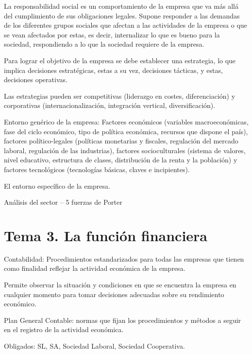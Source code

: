 \documentclass[12pt, twoside, openright]{report} %
\begin{document}
La responsabilidad social es un comportamiento de la empresa que va más allá del cumplimiento de sus
obligaciones legales. Supone responder a las demandas de los diferentes grupos sociales que afectan a las
actividades de la empresa o que se vean afectados por estas, es decir, internalizar lo que es bueno para la
sociedad, respondiendo a lo que la sociedad requiere de la empresa.

Para lograr el objetivo de la empresa se debe establecer una estrategia, lo que implica decisiones
estratégicas, estas a su vez, decisiones tácticas, y estas, decisiones operativas.

Las estrategias pueden ser competitivas (liderazgo en costes, diferenciación) y corporativas
(internacionalización, integración vertical, diversificación).

Entorno genérico de la empresa: Factores económicos (variables macroeconómicas, fase del ciclo
económico, tipo de política económica, recursos que dispone el país), factores político-legales (políticas
monetarias y fiscales, regulación del mercado laboral, regulación de las industrias), factores socioculturales
(sistema de valores, nivel educativo, estructura de clases, distribución de la renta y la población) y factores
tecnológicos (tecnologías básicas, claves e incipientes).

El entorno específico de la empresa.

Análisis del sector – 5 fuerzas de Porter
\begin{figure}[H]
  {\def\svgwidth{.9\textwidth}
  }
\end{figure}


\chapter{Tema 3. La función financiera}
Contabilidad: Procedimientos estandarizados para todas las empresas que tienen como finalidad reflejar la
actividad económica de la empresa.

Permite observar la situación y condiciones en que se encuentra la empresa en cualquier momento para
tomar decisiones adecuadas sobre su rendimiento económico.

Plan General Contable: normas que fijan los procedimientos y métodos a seguir en el registro de la actividad
económica.

Obligados: SL, SA, Sociedad Laboral, Sociedad Cooperativa.
\end{document}
